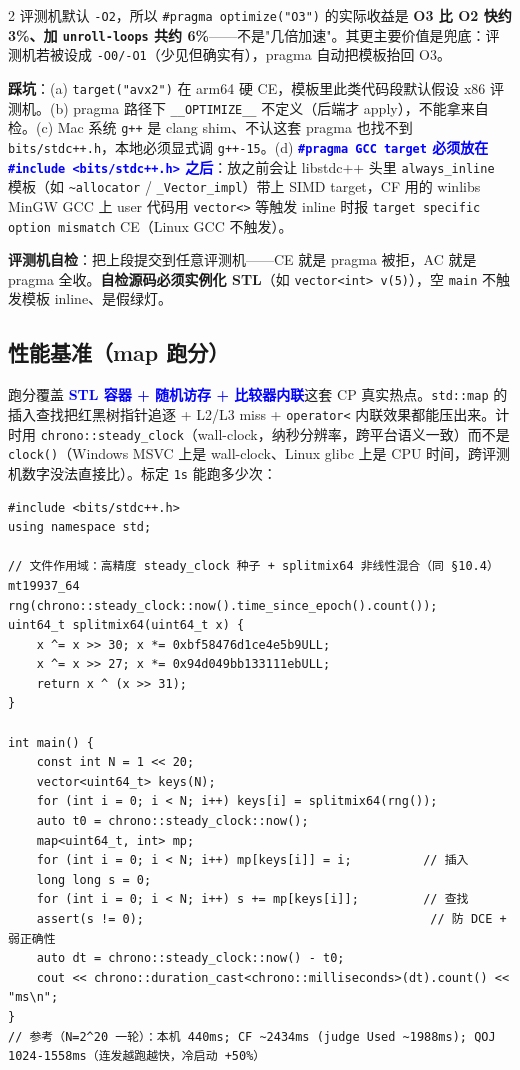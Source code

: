 \begin{multicols*}{2}
	评测机默认 \texttt{-O2}，所以 \texttt{\#pragma optimize("O3")} 的实际收益是 \textbf{O3 比 O2 快约 3\%、加 \texttt{unroll-loops} 共约 6\%}——不是"几倍加速"。其更主要价值是兜底：评测机若被设成 \texttt{-O0/-O1}（少见但确实有），pragma 自动把模板抬回 O3。

	\textbf{踩坑}：(a) \texttt{target("avx2")} 在 arm64 硬 CE，模板里此类代码段默认假设 x86 评测机。(b) pragma 路径下 \texttt{\_\_OPTIMIZE\_\_} 不定义（后端才 apply），不能拿来自检。(c) Mac 系统 \texttt{g++} 是 clang shim、不认这套 pragma 也找不到 \texttt{bits/stdc++.h}，本地必须显式调 \texttt{g++-15}。(d) \textcolor{blue}{\textbf{\texttt{\#pragma GCC target} 必须放在 \texttt{\#include <bits/stdc++.h>} 之后}}：放之前会让 libstdc++ 头里 \texttt{always\_inline} 模板（如 \texttt{\textasciitilde{}allocator} / \texttt{\_Vector\_impl}）带上 SIMD target，CF 用的 winlibs MinGW GCC 上 user 代码用 \texttt{vector<>} 等触发 inline 时报 \texttt{target specific option mismatch} CE（Linux GCC 不触发）。

	\textbf{评测机自检}：把上段提交到任意评测机——CE 就是 pragma 被拒，AC 就是 pragma 全收。\textbf{自检源码必须实例化 STL}（如 \texttt{vector<int> v(5)}），空 \texttt{main} 不触发模板 inline、是假绿灯。

	\subsection{性能基准（map 跑分）}

	跑分覆盖 \textcolor{blue}{\textbf{STL 容器 + 随机访存 + 比较器内联}}这套 CP 真实热点。\texttt{std::map} 的插入查找把红黑树指针追逐 + L2/L3 miss + \texttt{operator<} 内联效果都能压出来。计时用 \texttt{chrono::steady\_clock}（wall-clock，纳秒分辨率，跨平台语义一致）而不是 \texttt{clock()}（Windows MSVC 上是 wall-clock、Linux glibc 上是 CPU 时间，跨评测机数字没法直接比）。标定 \texttt{1s} 能跑多少次：

	\begin{verbatim}
#include <bits/stdc++.h>
using namespace std;

// 文件作用域：高精度 steady_clock 种子 + splitmix64 非线性混合（同 §10.4）
mt19937_64 rng(chrono::steady_clock::now().time_since_epoch().count());
uint64_t splitmix64(uint64_t x) {
    x ^= x >> 30; x *= 0xbf58476d1ce4e5b9ULL;
    x ^= x >> 27; x *= 0x94d049bb133111ebULL;
    return x ^ (x >> 31);
}

int main() {
    const int N = 1 << 20;
    vector<uint64_t> keys(N);
    for (int i = 0; i < N; i++) keys[i] = splitmix64(rng());
    auto t0 = chrono::steady_clock::now();
    map<uint64_t, int> mp;
    for (int i = 0; i < N; i++) mp[keys[i]] = i;          // 插入
    long long s = 0;
    for (int i = 0; i < N; i++) s += mp[keys[i]];         // 查找
    assert(s != 0);                                        // 防 DCE + 弱正确性
    auto dt = chrono::steady_clock::now() - t0;
    cout << chrono::duration_cast<chrono::milliseconds>(dt).count() << "ms\n";
}
// 参考（N=2^20 一轮）：本机 440ms; CF ~2434ms (judge Used ~1988ms); QOJ 1024-1558ms（连发越跑越快，冷启动 +50%）
	\end{verbatim}

\end{multicols*}

